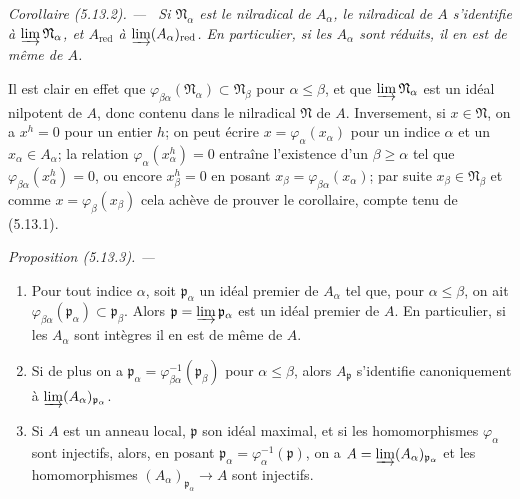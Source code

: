 \documentclass[10pt,oneside]{book}
\newcommand{\oldpage}[2][]{%
  \setcounter{footnote}{0}%
  \marginpar{\scriptsize\textbf{#1}~|~#2}\ignorespaces}
\newenvironment{proposition}[1][]{%
  \par\medskip\noindent\itshape Proposition (#1). ---\ }{\par}
\newenvironment{corollary}[1][]{%
  \par\medskip\noindent\itshape Corollaire (#1). ---\ }{\par}
\begin{document}
\begin{corollary}[5.13.2]
\label{IV.2.s5.13.2-fr}
Si $\mathfrak N_\alpha$ est le nilradical de $A_\alpha$, le nilradical de $A$
s'identifie à $\varinjlim\mathfrak N_\alpha$, et $A_{\mathrm{red}}$ à
$\varinjlim(A_\alpha)_{\mathrm{red}}$. En particulier, si les $A_\alpha$ sont
réduits, il en est de même de $A$.
\end{corollary}

\oldpage[IV-2]{132}

Il est clair en effet que
$\varphi_{\beta\alpha}(\mathfrak N_\alpha)\subset\mathfrak N_\beta$ pour
$\alpha\leq\beta$, et que $\varinjlim\mathfrak N_\alpha$ est un idéal
nilpotent de $A$, donc contenu dans le nilradical $\mathfrak N$ de $A$.
Inversement, si $x\in\mathfrak N$, on a $x^h=0$ pour un entier $h$; on peut
écrire $x=\varphi_\alpha(x_\alpha)$ pour un indice $\alpha$ et un
$x_\alpha\in A_\alpha$; la relation $\varphi_\alpha(x_\alpha^h)=0$ entraîne
l'existence d'un $\beta\geq\alpha$ tel que
$\varphi_{\beta\alpha}(x_\alpha^h)=0$, ou encore $x_\beta^h=0$ en posant
$x_\beta=\varphi_{\beta\alpha}(x_\alpha)$; par suite
$x_\beta\in\mathfrak N_\beta$ et comme $x=\varphi_\beta(x_\beta)$ cela achève
de prouver le corollaire, compte tenu de (5.13.1).

\begin{proposition}[5.13.3]
\label{IV.2.s5.13.3-fr}
\begin{enumerate}
\item[(i)] Pour tout indice $\alpha$, soit $\mathfrak p_\alpha$ un idéal
premier de $A_\alpha$ tel que, pour $\alpha\leq\beta$, on ait
$\varphi_{\beta\alpha}(\mathfrak p_\alpha)\subset\mathfrak p_\beta$. Alors
$\mathfrak p=\varinjlim\mathfrak p_\alpha$ est un idéal premier de $A$. En
particulier, si les $A_\alpha$ sont intègres il en est de même de $A$.
\item[(ii)] Si de plus on a
$\mathfrak p_\alpha=\varphi_{\beta\alpha}^{-1}(\mathfrak p_\beta)$ pour
$\alpha\leq\beta$, alors $A_{\mathfrak p}$ s'identifie canoniquement à
$\varinjlim(A_\alpha)_{\mathfrak p_\alpha}$.
\item[(iii)] Si $A$ est un anneau local, $\mathfrak p$ son idéal maximal, et
si les homomorphismes $\varphi_\alpha$ sont injectifs, alors, en posant
$\mathfrak p_\alpha=\varphi_\alpha^{-1}(\mathfrak p)$, on a
$A=\varinjlim(A_\alpha)_{\mathfrak p_\alpha}$ et les homomorphismes
$(A_\alpha)_{\mathfrak p_\alpha}\to A$ sont injectifs.
\end{enumerate}
\end{proposition}
\end{document}
